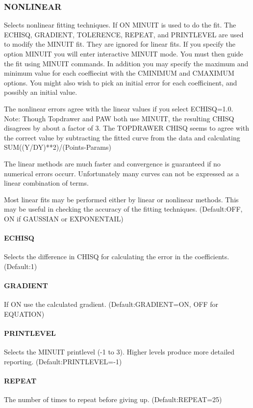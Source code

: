 \subsubsection{NONLINEAR   }
Selects  nonlinear  fitting techniques.  If ON MINUIT is used to do the
fit.  The ECHISQ, GRADIENT, TOLERENCE, REPEAT, and PRINTLEVEL are  used
to  modify  the  MINUIT fit.  They are ignored for linear fits.  If you
specify the option MINUIT you will enter interactive MINUIT mode.   You
must  then  guide  the  fit using MINUIT commands.  In addition you may
specify the maximum and minimum value for  each  coeffiecint  with  the
CMINIMUM  and CMAXIMUM options.  You might also wish to pick an initial
error for each coefficinent, and possibly an initial value.  

The  nonlinear  errors  agree  with  the  linear  values  if you select
ECHISQ=1.0.  Note:  Though Topdrawer  and  PAW  both  use  MINUIT,  the
resulting  CHISQ disagrees by about a factor of 3.  The TOPDRAWER CHISQ
seems to agree with the correct value by subtracting the  fitted  curve
from the data and calculating SUM((Y/DY)**2)/(Points-Params) 

The  linear methods are much faster and convergence is guaranteed if no
numerical  errors  occurr.   Unfortunately  many  curves  can  not   be
expressed as a linear combination of terms.  

Most  linear  fits  may  be  performed  either  by  linear or nonlinear
methods.  This may be useful in checking the accuracy  of  the  fitting
techniques.  
(Default:OFF, ON if GAUSSIAN or EXPONENTAIL) 
\paragraph{ECHISQ      }
Selects  the  difference  in  CHISQ  for calculating the error in the
coefficients.  
(Default:1) 
\paragraph{GRADIENT    }
If ON use the calculated gradient.  
(Default:GRADIENT=ON, OFF for EQUATION) 
\paragraph{PRINTLEVEL  }
Selects  the MINUIT printlevel (-1 to 3).  Higher levels produce more
detailed reporting.  
(Default:PRINTLEVEL=-1) 
\paragraph{REPEAT      }
The number of times to repeat before giving up.  
(Default:REPEAT=25) 
